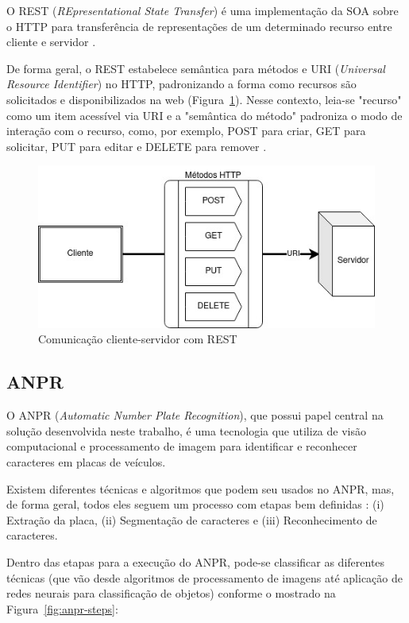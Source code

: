 \documentclass[12pt]{article}
\begin{document}
O REST (\textit{REpresentational State Transfer}) é uma implementação da SOA sobre o HTTP para transferência de representações de um determinado recurso entre cliente e servidor \cite{mumbaikar2013}.

De forma geral, o REST estabelece semântica para métodos e URI (\textit{Universal Resource Identifier}) no HTTP, padronizando a forma como recursos são solicitados e disponibilizados na web (Figura~\ref{fig:rest}). Nesse contexto, leia-se "recurso" como um item acessível via URI e a "semântica do método" padroniza o modo de interação com o recurso, como, por exemplo, {\scriptsize POST} para criar, {\scriptsize GET} para solicitar, {\scriptsize PUT} para editar e {\scriptsize DELETE} para remover \cite{adamczyk2011}.

\begin{figure}[ht]
	\centering
	\includegraphics[width=.8\textwidth]{rest.jpg}
	\caption{Comunicação cliente-servidor com REST}
	\label{fig:rest}
\end{figure} 


\subsection{ANPR}

O ANPR (\textit{Automatic Number Plate Recognition}), que possui papel central na solução desenvolvida neste trabalho, é uma tecnologia que utiliza de visão computacional e processamento de imagem para identificar e reconhecer caracteres em placas de veículos.

Existem diferentes técnicas e algoritmos que podem seu usados no ANPR, mas, de forma geral, todos eles seguem um processo com etapas bem definidas \cite{mufti2021}: (i) Extração da placa, (ii) Segmentação de caracteres e (iii) Reconhecimento de caracteres.

Dentro das etapas para a execução do ANPR, \cite{shashirangana2020} pode-se classificar as diferentes técnicas (que vão desde algoritmos de processamento de imagens até aplicação de redes neurais para classificação de objetos) conforme o mostrado na Figura~\ref{fig:anpr-steps}:
\end{document}
